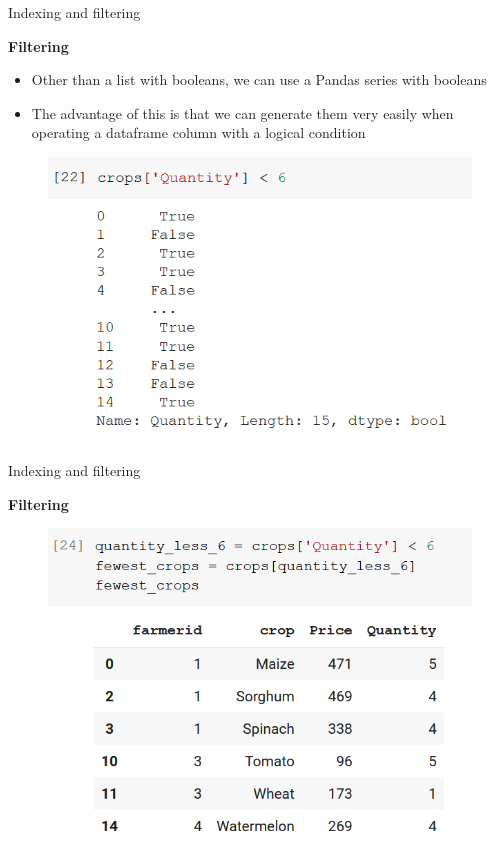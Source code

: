 \documentclass[aspectratio=169]{beamer}
\begin{document}
\begin{frame}{Indexing and filtering}

	\textbf{Filtering}

	\begin{itemize}
		\item Other than a list with booleans, we can use a Pandas series with booleans
		\item The advantage of this is that we can generate them very easily when operating a dataframe column with a logical condition
	\end{itemize}

	\begin{figure}
		\centering
		\includegraphics[width=0.45\linewidth]{img/boolean_series.png}
	\end{figure}


\end{frame}

\begin{frame}{Indexing and filtering}

	\textbf{Filtering}

	\begin{figure}
		\centering
		\includegraphics[width=0.6\linewidth]{img/fewest_crops.png}
	\end{figure}

\end{frame}
\end{document}
